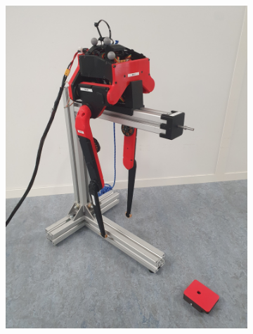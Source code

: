 \documentclass[a4paper,10pt]{article}
\begin{document}
\begin{figure}[H]
\label{fig:new_bolt_stand_2}
\centering

\begin{subfigure}{.5\textwidth}
\centering
  \includegraphics[width=1\linewidth, angle=0, scale=0.8]{./images/Bolt_stand_1.jpg}
\end{subfigure}%
\begin{subfigure}{.5\textwidth}
\centering

\end{subfigure}
\end{figure}
\end{document}
